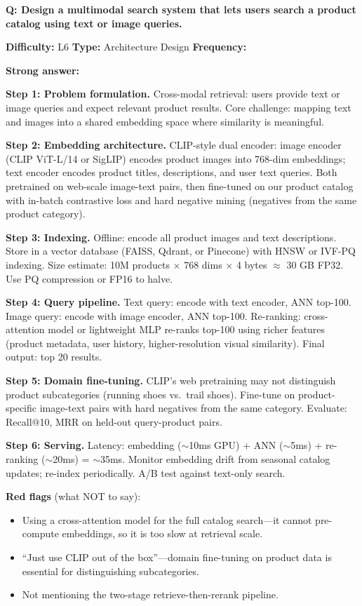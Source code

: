 \begin{interviewq}
\textbf{Q: Design a multimodal search system that lets users search a product catalog using text or image queries.}

\textbf{Difficulty:} L6 \quad \textbf{Type:} Architecture Design \quad \textbf{Frequency:} \freqmed{}

\textbf{Strong answer:}

\textbf{Step 1: Problem formulation.} Cross-modal retrieval: users provide text or image queries and expect relevant product results. Core challenge: mapping text and images into a shared embedding space where similarity is meaningful.

\textbf{Step 2: Embedding architecture.} CLIP-style dual encoder: image encoder (CLIP ViT-L/14 or SigLIP) encodes product images into 768-dim embeddings; text encoder encodes product titles, descriptions, and user text queries. Both pretrained on web-scale image-text pairs, then fine-tuned on our product catalog with in-batch contrastive loss and hard negative mining (negatives from the same product category).

\textbf{Step 3: Indexing.} Offline: encode all product images and text descriptions. Store in a vector database (FAISS, Qdrant, or Pinecone) with HNSW or IVF-PQ indexing. Size estimate: 10M products $\times$ 768 dims $\times$ 4 bytes $\approx$ 30 GB FP32. Use PQ compression or FP16 to halve.

\textbf{Step 4: Query pipeline.} Text query: encode with text encoder, ANN top-100. Image query: encode with image encoder, ANN top-100. Re-ranking: cross-attention model or lightweight MLP re-ranks top-100 using richer features (product metadata, user history, higher-resolution visual similarity). Final output: top 20 results.

\textbf{Step 5: Domain fine-tuning.} CLIP's web pretraining may not distinguish product subcategories (running shoes vs.\ trail shoes). Fine-tune on product-specific image-text pairs with hard negatives from the same category. Evaluate: Recall@10, MRR on held-out query-product pairs.

\textbf{Step 6: Serving.} Latency: embedding ($\sim$10ms GPU) + ANN ($\sim$5ms) + re-ranking ($\sim$20ms) = $\sim$35ms. Monitor embedding drift from seasonal catalog updates; re-index periodically. A/B test against text-only search.

\textbf{Red flags} (what NOT to say):
\begin{itemize}
    \item Using a cross-attention model for the full catalog search---it cannot pre-compute embeddings, so it is too slow at retrieval scale.
    \item ``Just use CLIP out of the box''---domain fine-tuning on product data is essential for distinguishing subcategories.
    \item Not mentioning the two-stage retrieve-then-rerank pipeline.
\end{itemize}


\end{interviewq}
